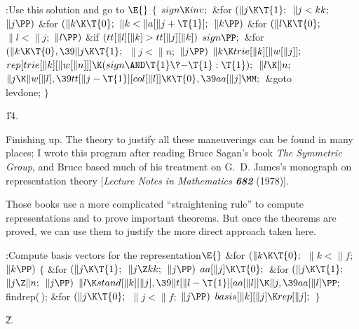 \B{}:Use this solution and go to \X${}\E{}$\6
${}\{{}$\1\6
${}\\{sign}\K\\{inv};{}$\6
\&{for} ${}(\|j\K\T{1};{}$ ${}\|j<\\{kk};{}$ ${}\|j\PP){}$\1\6
\&{for} ${}(\|k\K\T{0};{}$ ${}\|k<\|a[\|j+\T{1}];{}$ ${}\|k\PP){}$\1\6
\&{for} ${}(\|l\K\T{0};{}$ ${}\|l<\|j;{}$ ${}\|l\PP){}$\1\6
\&{if} ${}(\\{tt}[\|l][\|k]>\\{tt}[\|j][\|k]){}$\1\5
${}\\{sign}\PP;{}$\2\2\2\2\6
\&{for} ${}(\|k\K\T{0},\39\|j\K\T{1};{}$ ${}\|j<\|n;{}$ ${}\|j\PP){}$\1\5
${}\|k\K\\{trie}[\|k][\|w[\|j]];{}$\2\6
${}\\{rep}[\\{trie}[\|k][\|w[\|n]]]\K(\\{sign}\AND\T{1}\?{-}\T{1}:\T{1});{}$\6
${}\|l\K\|n;{}$\6
${}\|j\K\|w[\|l],\39\\{tt}[\|j-\T{1}][\\{col}[\|l]]\K\T{0},\39\\{aa}[\|j]%
\MM;{}$\6
\&{goto} \\{levdone};\6
\4${}\}{}$\2\par
\U14.\fi

Finishing up. The theory to justify all these maneuverings can
be found in many places; I wrote this program after reading
Bruce Sagan's book {\sl The Symmetric Group}, and Bruce based much of
his treatment on G.~D. James's monograph on representation theory
[{\sl Lecture Notes in Mathematics\/ \bf682} (1978)].

Those books use a more complicated ``straightening rule'' to compute
representations and to prove important theorems. But once the theorems are
proved, we can use them to justify the more direct approach taken here.

\Y\B\4:Compute  basis vectors for the representation\X${}\E{}$\6
\&{for} ${}(\|k\K\T{0};{}$ ${}\|k<\|f;{}$ ${}\|k\PP){}$\5
${}\{{}$\1\6
\&{for} ${}(\|j\K\T{1};{}$ ${}\|j\Z\\{kk};{}$ ${}\|j\PP){}$\1\5
${}\\{aa}[\|j]\K\T{0};{}$\2\6
\&{for} ${}(\|j\K\T{1};{}$ ${}\|j\Z\|n;{}$ ${}\|j\PP){}$\1\5
${}\|l\K\\{stand}[\|k][\|j],\39\|t[\|l-\T{1}][\\{aa}[\|l]]\K\|j,\39\\{aa}[\|l]%
\PP;{}$\2\6
\\{findrep}(\,);\6
\&{for} ${}(\|j\K\T{0};{}$ ${}\|j<\|f;{}$ ${}\|j\PP){}$\1\5
${}\\{basis}[\|k][\|j]\K\\{rep}[\|j];{}$\2\6
\4${}\}{}$\2\par
\U2.\fi

